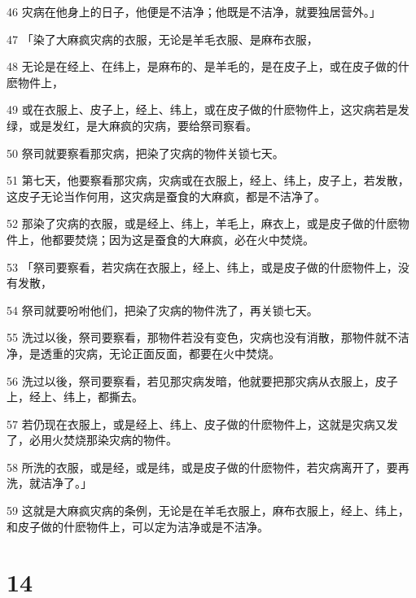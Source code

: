 \par 46 灾病在他身上的日子，他便是不洁净；他既是不洁净，就要独居营外。」
\par 47 「染了大麻疯灾病的衣服，无论是羊毛衣服、是麻布衣服，
\par 48 无论是在经上、在纬上，是麻布的、是羊毛的，是在皮子上，或在皮子做的什麽物件上，
\par 49 或在衣服上、皮子上，经上、纬上，或在皮子做的什麽物件上，这灾病若是发绿，或是发红，是大麻疯的灾病，要给祭司察看。
\par 50 祭司就要察看那灾病，把染了灾病的物件关锁七天。
\par 51 第七天，他要察看那灾病，灾病或在衣服上，经上、纬上，皮子上，若发散，这皮子无论当作何用，这灾病是蚕食的大麻疯，都是不洁净了。
\par 52 那染了灾病的衣服，或是经上、纬上，羊毛上，麻衣上，或是皮子做的什麽物件上，他都要焚烧；因为这是蚕食的大麻疯，必在火中焚烧。
\par 53 「祭司要察看，若灾病在衣服上，经上、纬上，或是皮子做的什麽物件上，没有发散，
\par 54 祭司就要吩咐他们，把染了灾病的物件洗了，再关锁七天。
\par 55 洗过以後，祭司要察看，那物件若没有变色，灾病也没有消散，那物件就不洁净，是透重的灾病，无论正面反面，都要在火中焚烧。
\par 56 洗过以後，祭司要察看，若见那灾病发暗，他就要把那灾病从衣服上，皮子上，经上、纬上，都撕去。
\par 57 若仍现在衣服上，或是经上、纬上、皮子做的什麽物件上，这就是灾病又发了，必用火焚烧那染灾病的物件。
\par 58 所洗的衣服，或是经，或是纬，或是皮子做的什麽物件，若灾病离开了，要再洗，就洁净了。」
\par 59 这就是大麻疯灾病的条例，无论是在羊毛衣服上，麻布衣服上，经上、纬上，和皮子做的什麽物件上，可以定为洁净或是不洁净。

\chapter{14}

